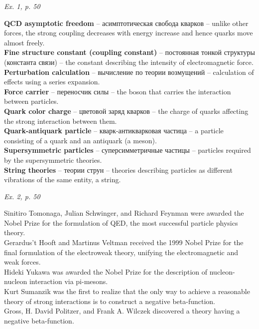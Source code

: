 \documentclass[a4paper, 12pt]{article}
\def\task#1{\begin{center}\it #1\end{center}}
\newif\ifcols
\begin{document}
\task{Ex. 1, p. 50}
\ifcols\begin{multicols}{2}\fi%
  \textbf{QCD asymptotic freedom} -- асимптотическая свобода кварков -- unlike other forces, the strong coupling decreases with energy increase and hence quarks move almost freely.
\\\textbf{Fine structure constant (coupling constant)} -- постоянная тонкой структуры (константа связи) -- the constant describing the intensity of electromagnetic force.
\\\textbf{Perturbation calculation} -- вычисление по теории возмущений -- calculation of effects using a series expansion.
\\\textbf{Force carrier} -- переносчик силы -- the boson that carries the interaction between particles.
\\\textbf{Quark color charge} -- цветовой заряд кварков -- the charge of quarks affecting the strong interaction between them.
\\\textbf{Quark-antiquark particle} -- кварк-антикварковая частица -- a particle consisting of a quark and an antiquark (a meson).
\\\textbf{Supersymmetric particles} -- суперсимметричные частицы -- particles required by the supersymmetric theories.
\\\textbf{String theories} -- теории струн -- theories describing particles as different vibrations of the same entity, a string.
\ifcols\end{multicols}\fi%

\task{Ex. 2, p. 50}
\ifcols\begin{multicols}{2}\fi%
Sinitiro Tomonaga, Julian Schwinger, and Richard Feynman were awarded the Nobel Prize for the formulation of QED, the most successful particle physics theory.
\\Gerardus’t Hooft and Martinus Veltman received the 1999 Nobel Prize for the final formulation of the electroweak theory, unifying the electromagnetic and weak forces.
\\Hideki Yukawa was awarded the Nobel Prize for the description of nucleon-nucleon interaction via pi-mesons.
\\Kurt Sumanzik was the first to realize that the only way to achieve a reasonable theory of strong interactions is to construct a negative beta-function.
\\Gross, H. David Politzer, and Frank A. Wilczek discovered a theory having a negative beta-function.
\ifcols\end{multicols}\fi%
\end{document}
